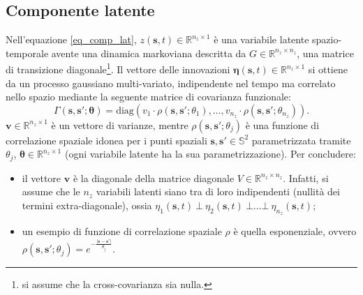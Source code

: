 \subsection[Componente latente]{Componente latente}
Nell'equazione \ref{eq_comp_lat}, $z(\mathbf{s}, t)\in \mathbb{R}^{n_z\times 1}$ è una variabile latente spazio-temporale avente una dinamica markoviana descritta da $G\in\mathbb{R}^{n_z\times n_z}$, una matrice di transizione diagonale\footnote{si assume che la cross-covarianza sia nulla.}. Il vettore delle innovazioni $\boldsymbol{\eta}(\mathbf{s}, t)\in\mathbb{R}^{n_z\times 1}$ si ottiene da un processo gaussiano multi-variato, indipendente nel tempo ma correlato nello spazio mediante la seguente matrice di covarianza funzionale:
\[
	\Gamma(\mathbf{s}, \mathbf{s}';\boldsymbol{\theta})=\text{diag}(v_1\cdot\rho(\mathbf{s}, \mathbf{s}';\theta_1),\dots,v_{n_z}\cdot\rho(\mathbf{s}, \mathbf{s}';\theta_{n_z})).
\]
$\mathbf{v}\in\mathbb{R}^{n_z\times 1}$ è un vettore di varianze, mentre $\rho(\mathbf{s}, \mathbf{s}'; \theta_j)$ è una funzione di correlazione spaziale idonea per i punti spaziali $\mathbf{s}, \mathbf{s}'\in\mathbb{S}^2$ parametrizzata tramite $\theta_j$, $\boldsymbol{\theta}\in\mathbb{R}^{n_z\times 1}$ (ogni variabile latente ha la sua parametrizzazione). Per concludere:
\begin{itemize}
	\item il vettore $\mathbf{v}$ è la diagonale della matrice diagonale $V\in\mathbb{R}^{n_z\times n_z}$. Infatti, si assume che le $n_z$ variabili latenti siano tra di loro indipendenti (nullità dei termini extra-diagonale), ossia $\eta_1(\mathbf{s}, t)\ \bot\ \eta_2(\mathbf{s}, t)\ \bot\dots\bot \ \eta_{n_z}(\mathbf{s}, t)$;
	\item un esempio di funzione di correlazione spaziale $\rho$ è quella esponenziale, ovvero $\rho(\mathbf{s}, \mathbf{s}'; \theta_j) = e^{-\frac{\lvert\mathbf{s} - \mathbf{s}'\lvert}{\theta_j}}$.
\end{itemize}

